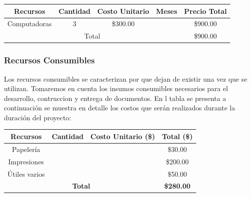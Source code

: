 \documentclass[12pt]{report}%
\begin{document}
\begin{table}[htbp]
\begin{tabular}{|c|c|c|c|c|}
\hline
\rowcolor[HTML]{9698ED} 
{\color[HTML]{000000} \textbf{Recursos}} & {\color[HTML]{000000} \textbf{Cantidad}} & {\color[HTML]{000000} \textbf{Costo Unitario}} & {\color[HTML]{000000} \textbf{Meses}} & {\color[HTML]{000000} \textbf{Precio Total}} \\ \hline
Computadoras                             & 3                                        & \$300.00                                       &                                       & \$900.00                                     \\ \hline                                  
\multicolumn{4}{|c|}{Total}                                                                                                                                                  & \$900.00                                   \\ \hline
\end{tabular}
\end{table}

\subsubsection{Recursos Consumibles}
Los recursos consumibles se caracterizan por que dejan de existir una vez que se utilizan.
Tomaremos en cuenta los insumos consumibles necesarios para el desarrollo, contruccion y entrega
de documentos.
En l tabla se presenta a continuación se muestra en detalle los costos que serán realizados durante la duración del proyecto:

\begin{table}[htbp]
\begin{tabular}{|c|c|c|c|}
\hline
\rowcolor[HTML]{9698ED} 
\textbf{Recursos} & \textbf{Cantidad} & \textbf{Costo Unitario (\$)} & \textbf{Total (\$)} \\ \hline
Papelería         &                   &                              & \$30.00             \\ \hline
Impresiones       &                   &                              & \$200.00            \\ \hline
Útiles varios     &                   &                              & \$50.00             \\ \hline
\multicolumn{3}{|c|}{\textbf{Total}}                                 & \textbf{\$280.00}   \\ \hline
\end{tabular}
\end{table}
\newpage
\end{document}
